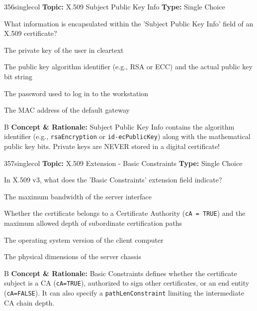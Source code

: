 \begin{qcard}{356}{singlecol}
\textcolor{darkslate!75}{\small\textbf{Topic:} X.509 Subject Public Key Info \hfill \textbf{Type:} Single Choice}\vspace{0.4em}\par
What information is encapsulated within the 'Subject Public Key Info' field of an X.509 certificate?
\begin{qoptions}
\item The private key of the user in cleartext
\item The public key algorithm identifier (e.g., RSA or ECC) and the actual public key bit string
\item The password used to log in to the workstation
\item The MAC address of the default gateway
\end{qoptions}
\end{qcard}
\nopagebreak
\begin{explainbox}{B}
\textbf{Concept \& Rationale:} Subject Public Key Info contains the algorithm identifier (e.g., \texttt{rsaEncryption} or \texttt{id-ecPublicKey}) along with the mathematical public key bits. Private keys are NEVER stored in a digital certificate!
\end{explainbox}

\begin{qcard}{357}{singlecol}
\textcolor{darkslate!75}{\small\textbf{Topic:} X.509 Extension - Basic Constraints \hfill \textbf{Type:} Single Choice}\vspace{0.4em}\par
In X.509 v3, what does the 'Basic Constraints' extension field indicate?
\begin{qoptions}
\item The maximum bandwidth of the server interface
\item Whether the certificate belongs to a Certificate Authority (\texttt{cA = TRUE}) and the maximum allowed depth of subordinate certification paths
\item The operating system version of the client computer
\item The physical dimensions of the server chassis
\end{qoptions}
\end{qcard}
\nopagebreak
\begin{explainbox}{B}
\textbf{Concept \& Rationale:} Basic Constraints defines whether the certificate subject is a CA (\texttt{cA=TRUE}), authorized to sign other certificates, or an end entity (\texttt{cA=FALSE}). It can also specify a \texttt{pathLenConstraint} limiting the intermediate CA chain depth.
\end{explainbox}

